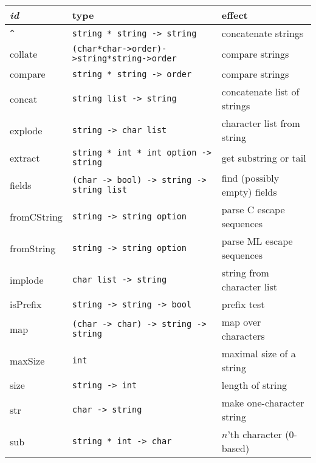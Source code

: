 \documentclass[fleqn]{article}
\begin{document}
\noindent\begin{tabular}{@{\tt\ \ }lll}\hline
{\it id\/}  &  type &     effect \\\hline

\verb#^# & {\tt string * string -> string} & concatenate strings\\

collate & {\tt (char*char->order)->string*string->order} & compare strings\\

compare & {\tt string * string -> order} & compare strings\\

concat    & {\tt string list -> string} & concatenate list of strings
\\

explode   & {\tt string -> char list} & character list from string\\

extract & {\tt string * int * int option -> string} & get substring or tail\\

fields    & {\tt (char -> bool) -> string -> string list} & find
(possibly empty) fields\\

fromCString & {\tt string -> string option} & parse C escape
sequences\\ 

fromString & {\tt string -> string option} & parse ML escape sequences\\

implode   & {\tt char list -> string} & string from character list\\

isPrefix  & {\tt string -> string -> bool} & prefix test\\

map       & {\tt (char -> char) -> string -> string} & map over characters\\

maxSize   & \verb#int# & maximal size of a string\\

size      & {\tt string -> int}
          & length of string\\

str       & {\tt char -> string} & make one-character string\\

sub       & {\tt string * int -> char}
          & $n$'th character (0-based)\\


\end{tabular}
\end{document}
